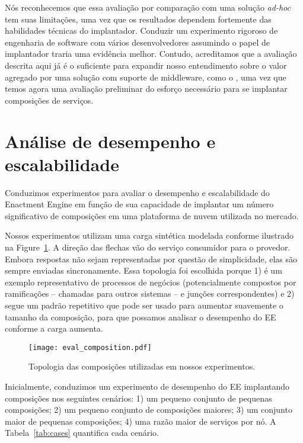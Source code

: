 Nós reconhecemos que essa avaliação por comparação com uma solução \emph{ad-hoc}
tem suas limitações, uma vez que os resultados dependem fortemente das
habilidades técnicas do implantador.
Conduzir um experimento rigoroso de engenharia de software com vários
desenvolvedores assumindo o papel de implantador traria uma evidência melhor.
Contudo, acreditamos que a avaliação descrita aqui já é o suficiente
para expandir nosso entendimento sobre o valor agregado por uma solução
com suporte de middleware, como o \ee, uma vez que temos agora uma avaliação preliminar
do esforço necessário para se implantar composições de serviços.

\section{Análise de desempenho e escalabilidade}

Conduzimos experimentos para avaliar o desempenho e escalabilidade do
Enactment Engine em função de sua capacidade de implantar um número significativo
de composições em uma plataforma de nuvem utilizada no mercado.

Nossos experimentos utilizam uma carga sintética modelada conforme ilustrado na Figure~\ref{fig:eval_composition}.
A direção das flechas vão do serviço consumidor para o provedor.
Embora respostas não sejam representadas por questão de simplicidade,
elas são sempre enviadas sincronamente.
Essa topologia foi escolhida porque 1) é um exemplo representativo de processos de negócios
(potencialmente compostos por ramificações -- chamadas para outros sistemas -- e junções correspondentes)
e 2) segue um padrão repetitivo que pode ser usado para aumentar suavemente o tamanho da composição,
para que possamos analisar o desempenho do EE conforme a carga aumenta.


\begin{figure}[h]
  \centering
  \texttt{[image: eval\_composition.pdf]}
  \caption{Topologia das composições utilizadas em nossos experimentos.}
  \label{fig:eval_composition}
\end{figure}


Inicialmente, conduzimos um experimento
de desempenho do EE implantando composições nos seguintes cenários:
1) um pequeno conjunto de pequenas composições;
2) um pequeno conjunto de composições maiores;
3) um conjunto maior de pequenas composições;
4) uma razão maior de serviços por nó.
A Tabela~\ref{tab:cases} quantifica cada cenário.

